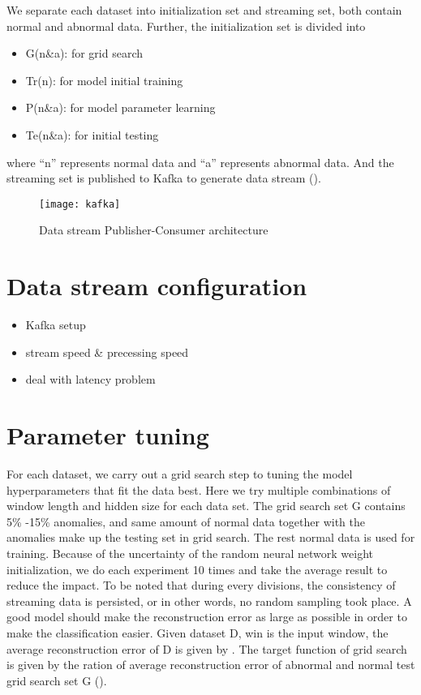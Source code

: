 We separate each dataset into initialization set and streaming set, both contain normal and abnormal data. Further, the initialization set is divided into 
\begin{itemize}
\item G(n\&a): for grid search
\item Tr(n): for model initial training
\item P(n\&a): for model parameter learning
\item Te(n\&a): for initial testing
\end{itemize}
where “n” represents normal data and “a” represents abnormal data. And the streaming set is published to Kafka to generate data stream ().

\begin{figure}[h]
\centering
\texttt{[image: kafka]}
\caption[Data stream Publisher-Consumer architecture]{Data stream Publisher-Consumer architecture}
\label{fig:kafka}
\end{figure}



\section{Data stream configuration}
\label{sec:datastream}

\begin{itemize}
\item Kafka setup
\item stream speed \& precessing speed
\item deal with latency problem
\end{itemize}


\section{Parameter tuning}
\label{sec:parametertuning}

For each dataset, we carry out a grid search step to tuning the model hyperparameters that fit the data best. Here we try multiple combinations of window length and hidden size for each data set. The grid search set G contains 5\% -15\% anomalies, and same amount of normal data together with the anomalies make up the testing set in grid search. The rest normal data is used for training. Because of the uncertainty of the random neural network weight initialization, we do each experiment 10 times and take the average result to reduce the impact. To be noted that during every divisions, the consistency of streaming data is persisted, or in other words, no random sampling took place. A good model should make the reconstruction error as large as possible in order to make the classification easier. Given dataset D,  win is the input window, the average reconstruction error of D is given by . The target function of grid search is given by the ration of average reconstruction error of abnormal and normal test grid search set G ().

